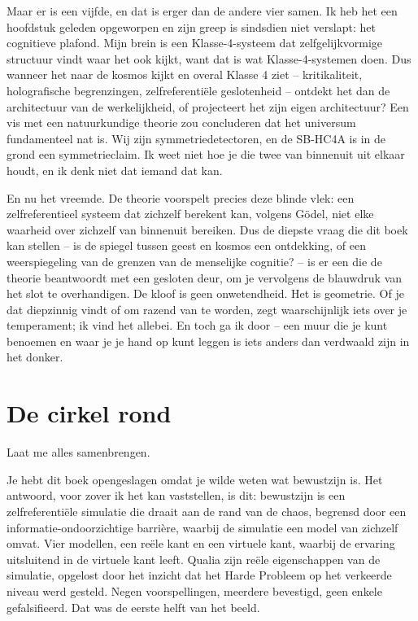 \documentclass[11pt, twoside, openright]{book}
\begin{document}
Maar er is een vijfde, en dat is erger dan de andere vier samen. Ik heb het een hoofdstuk geleden opgeworpen en zijn greep is sindsdien niet verslapt: het cognitieve plafond. Mijn brein is een Klasse-4-systeem dat zelfgelijkvormige structuur vindt waar het ook kijkt, want dat is wat Klasse-4-systemen doen. Dus wanneer het naar de kosmos kijkt en overal Klasse 4 ziet -- kritikaliteit, holografische begrenzingen, zelfreferentiële geslotenheid -- ontdekt het dan de architectuur van de werkelijkheid, of projecteert het zijn eigen architectuur? Een vis met een natuurkundige theorie zou concluderen dat het universum fundamenteel nat is. Wij zijn symmetriedetectoren, en de SB-HC4A is in de grond een symmetrieclaim. Ik weet niet hoe je die twee van binnenuit uit elkaar houdt, en ik denk niet dat iemand dat kan.

En nu het vreemde. De theorie voorspelt precies deze blinde vlek: een zelfreferentieel systeem dat zichzelf berekent kan, volgens Gödel, niet elke waarheid over zichzelf van binnenuit bereiken. Dus de diepste vraag die dit boek kan stellen -- is de spiegel tussen geest en kosmos een ontdekking, of een weerspiegeling van de grenzen van de menselijke cognitie? -- is er een die de theorie beantwoordt met een gesloten deur, om je vervolgens de blauwdruk van het slot te overhandigen. De kloof is geen onwetendheid. Het is geometrie. Of je dat diepzinnig vindt of om razend van te worden, zegt waarschijnlijk iets over je temperament; ik vind het allebei. En toch ga ik door -- een muur die je kunt benoemen en waar je je hand op kunt leggen is iets anders dan verdwaald zijn in het donker.

\section*{De cirkel rond}

Laat me alles samenbrengen.

Je hebt dit boek opengeslagen omdat je wilde weten wat bewustzijn is. Het antwoord, voor zover ik het kan vaststellen, is dit: bewustzijn is een zelfreferentiële simulatie die draait aan de rand van de chaos, begrensd door een informatie-ondoorzichtige barrière, waarbij de simulatie een model van zichzelf omvat. Vier modellen, een reële kant en een virtuele kant, waarbij de ervaring uitsluitend in de virtuele kant leeft. Qualia zijn reële eigenschappen van de simulatie, opgelost door het inzicht dat het Harde Probleem op het verkeerde niveau werd gesteld. Negen voorspellingen, meerdere bevestigd, geen enkele gefalsifieerd. Dat was de eerste helft van het beeld.
\end{document}
